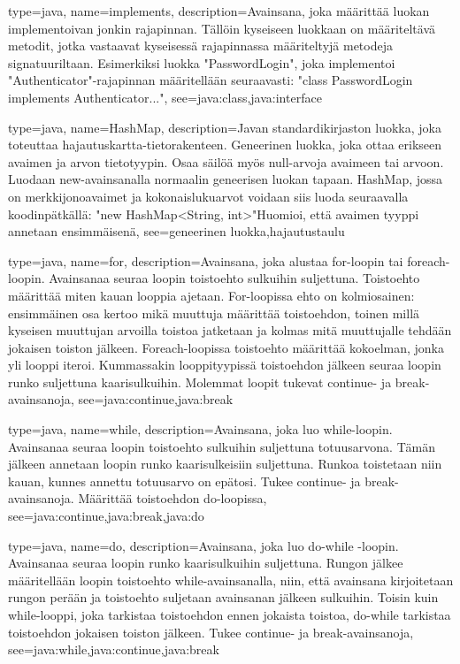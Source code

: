 {
	type=java,
	name=implements,
	description={Avainsana, joka määrittää luokan implementoivan jonkin rajapinnan. Tällöin
kyseiseen luokkaan on määriteltävä metodit, jotka vastaavat kyseisessä rajapinnassa määriteltyjä
metodeja signatuuriltaan. Esimerkiksi luokka "PasswordLogin", joka implementoi
"Authenticator"-rajapinnan määritellään seuraavasti:\newline{}
"class PasswordLogin implements Authenticator..."},
	see={java:class,java:interface}
}

{
	type=java,
	name=HashMap,
	description={Javan standardikirjaston luokka, joka toteuttaa hajautuskartta-tietorakenteen.
Geneerinen luokka, joka ottaa erikseen avaimen ja arvon tietotyypin. Osaa säilöä myös null-arvoja
avaimeen tai arvoon. Luodaan new-avainsanalla normaalin geneerisen luokan tapaan. HashMap, jossa
on merkkijonoavaimet ja kokonaislukuarvot voidaan siis luoda seuraavalla koodinpätkällä:
\newline{}"new HashMap<String, int>"\newline{}Huomioi, että avaimen tyyppi annetaan ensimmäisenä},
	see={geneerinen luokka,hajautustaulu}
}

{
	type=java,
	name=for,
	description={Avainsana, joka alustaa for-loopin tai foreach-loopin. Avainsanaa seuraa loopin
toistoehto sulkuihin suljettuna. Toistoehto määrittää miten kauan looppia ajetaan. For-loopissa
ehto on kolmiosainen: ensimmäinen osa kertoo mikä muuttuja määrittää toistoehdon, toinen millä
kyseisen muuttujan arvoilla toistoa jatketaan ja kolmas mitä muuttujalle tehdään jokaisen toiston
jälkeen. Foreach-loopissa toistoehto määrittää kokoelman, jonka yli looppi iteroi. Kummassakin
looppityypissä toistoehdon jälkeen seuraa loopin runko suljettuna kaarisulkuihin. Molemmat loopit
tukevat continue- ja break-avainsanoja},
	see={java:continue,java:break}
}

{
	type=java,
	name=while,
	description={Avainsana, joka luo while-loopin. Avainsanaa seuraa loopin toistoehto sulkuihin
suljettuna totuusarvona. Tämän jälkeen annetaan loopin runko kaarisulkeisiin suljettuna. Runkoa
toistetaan niin kauan, kunnes annettu totuusarvo on epätosi. Tukee continue- ja 
break-avainsanoja. Määrittää toistoehdon do-loopissa},
	see={java:continue,java:break,java:do}
}

{
	type=java,
	name=do,
	description={Avainsana, joka luo do-while -loopin. Avainsanaa seuraa loopin runko
kaarisulkuihin suljettuna. Rungon jälkee määritellään loopin toistoehto while-avainsanalla, niin,
että avainsana kirjoitetaan rungon perään ja toistoehto suljetaan avainsanan jälkeen sulkuihin.
Toisin kuin while-looppi, joka tarkistaa toistoehdon ennen jokaista toistoa, do-while tarkistaa
toistoehdon jokaisen toiston jälkeen. Tukee continue- ja break-avainsanoja},
	see={java:while,java:continue,java:break}
}

